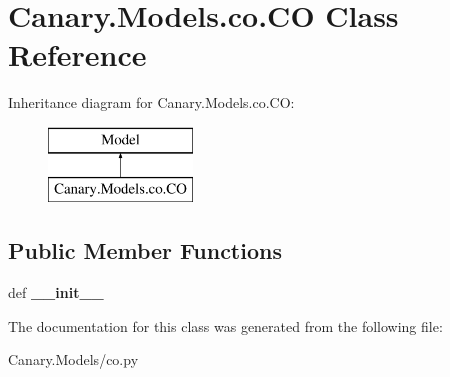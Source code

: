 \hypertarget{class_canary_8_models_1_1co_1_1_c_o}{\section{Canary.\-Models.\-co.\-C\-O Class Reference}
\label{class_canary_8_models_1_1co_1_1_c_o}
}
Inheritance diagram for Canary.\-Models.\-co.\-C\-O\-:\begin{figure}[H]
\begin{center}
\leavevmode
\includegraphics[height=2.000000cm]{class_canary_8_models_1_1co_1_1_c_o}
\end{center}
\end{figure}
\subsection*{Public Member Functions}
\begin{DoxyCompactItemize}
\item 
\hypertarget{class_canary_8_models_1_1co_1_1_c_o_af679ca12b15639db0f87b01363a41920}{def {\bfseries \-\_\-\-\_\-init\-\_\-\-\_\-}}\label{class_canary_8_models_1_1co_1_1_c_o_af679ca12b15639db0f87b01363a41920}

\end{DoxyCompactItemize}


The documentation for this class was generated from the following file\-:\begin{DoxyCompactItemize}
\item 
Canary.\-Models/co.\-py\end{DoxyCompactItemize}
